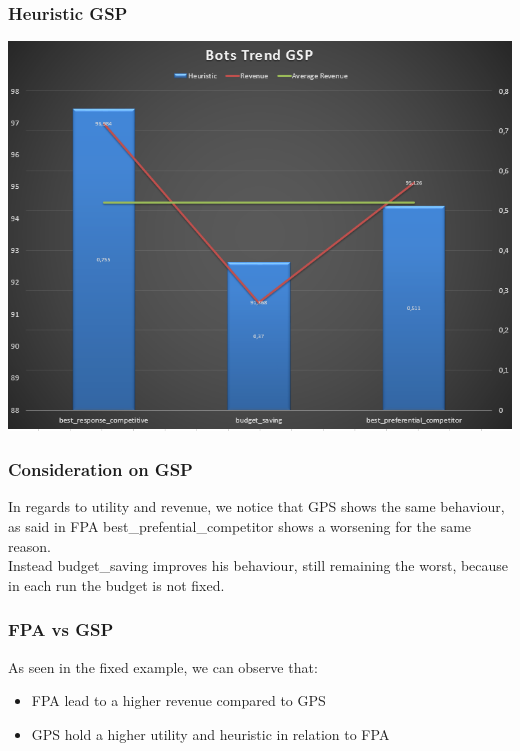 \documentclass{beamer}
\begin{document}
\begin{frame}
\frametitle{Heuristic GSP}
\begin{center}
\includegraphics[scale=0.46]{img/Auctions/RGSP_all_Heuristic.PNG}
\end{center}
\end{frame}

\begin{frame}
\frametitle{Consideration on GSP}
In regards to utility and revenue, we notice that GPS shows the \alert{same} behaviour, as said in FPA best\_prefential\_competitor shows a \alert{worsening} for the same reason.\\
\medskip
Instead budget\_saving \alert{improves} his behaviour, still remaining the worst, because in each run the budget is not fixed.
\end{frame}

\begin{frame}
\frametitle{FPA vs GSP}
As seen in the fixed example, we can observe that:
\begin{itemize}
\item FPA lead to a \alert{higher} revenue compared to GPS
\item GPS hold a \alert{higher} utility and heuristic in relation to FPA
\end{itemize}
\end{frame}
\end{document}

